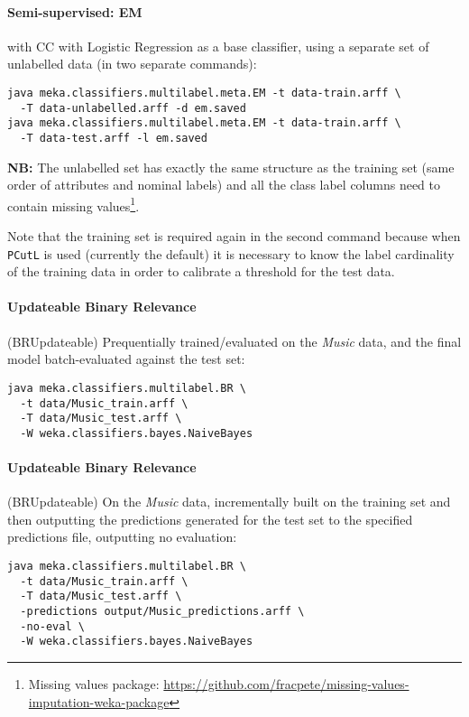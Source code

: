 \documentclass[11pt]{article}
\begin{document}
\paragraph{Semi-supervised: EM} with CC with Logistic Regression as a base classifier, using a separate set of unlabelled data (in two separate commands):
\begin{lstlisting}
java meka.classifiers.multilabel.meta.EM -t data-train.arff \
  -T data-unlabelled.arff -d em.saved
java meka.classifiers.multilabel.meta.EM -t data-train.arff \
  -T data-test.arff -l em.saved
\end{lstlisting}
\textbf{NB:} The unlabelled set has exactly the same structure as the training set (same order of
attributes and nominal labels) and all the class label columns need to contain missing
values\footnote{Missing values package: \url{https://github.com/fracpete/missing-values-imputation-weka-package}}.

Note that the training set is required again in the second command because when \texttt{PCutL} is used (currently the default) it is necessary to know the label cardinality of the training data in order to calibrate a threshold for the test data.

\paragraph{Updateable Binary Relevance} (BRUpdateable) Prequentially trained/evaluated on the \textit{Music} data, and the final model batch-evaluated against the test set:
\begin{lstlisting}
java meka.classifiers.multilabel.BR \
  -t data/Music_train.arff \
  -T data/Music_test.arff \
  -W weka.classifiers.bayes.NaiveBayes
\end{lstlisting}

\paragraph{Updateable Binary Relevance} (BRUpdateable) On the \textit{Music} data, incrementally built on the training set and then outputting the predictions generated for the test set to the specified predictions file, outputting no evaluation:
\begin{lstlisting}
java meka.classifiers.multilabel.BR \
  -t data/Music_train.arff \
  -T data/Music_test.arff \
  -predictions output/Music_predictions.arff \
  -no-eval \
  -W weka.classifiers.bayes.NaiveBayes
\end{lstlisting}
\end{document}
